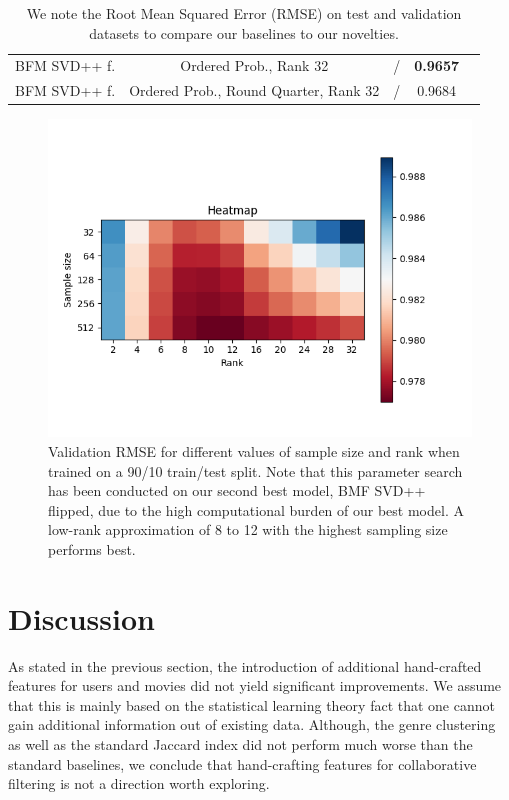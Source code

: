 \documentclass[10pt,conference,compsocconf]{IEEEtran}
\begin{document}
\begin{table}
{\begin{tabular}{|| c | c | c | c | c ||}
                BFM SVD++ f.         & Ordered Prob., Rank 32                & /                       & \textbf{ 0.9657 }      &                         \\
                BFM SVD++ f.         & Ordered Prob., Round Quarter, Rank 32 & /                       & 0.9684                 &                         \\
                \hline
            \end{tabular}
        }
        \caption{We note the Root Mean Squared Error (RMSE) on test and validation datasets to compare our baselines to our novelties.}
        \label{tab:ablation}
    \end{table}


    \begin{figure}
        \includegraphics[width=\columnwidth]{figures/heatmap.png}
        \caption{Validation RMSE for different values of sample size and rank when trained on a 90/10 train/test split. Note that this parameter search has been conducted on our second best model, BMF SVD++ flipped, due to the high computational burden of our best model.
        A low-rank approximation of 8 to 12 with the highest sampling size performs best.}
        \label{fig:Heatmap}
    \end{figure}


    \section{Discussion}
    As stated in the previous section, the introduction of additional hand-crafted features for users and movies did not yield significant improvements.
    We assume that this is mainly based on the statistical learning theory fact that one cannot gain additional information out of existing data.
    Although, the genre clustering as well as the standard Jaccard index did not perform much worse than the standard baselines, we conclude that hand-crafting features for collaborative filtering is not a direction worth exploring.
\end{document}
